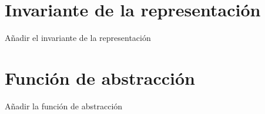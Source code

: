 \hypertarget{repArbolGeneral_invArbolGeneral}{}\section{Invariante de la representación}\label{repArbolGeneral_invArbolGeneral}
Añadir el invariante de la representación\hypertarget{repArbolGeneral_faArbolGeneral}{}\section{Función de abstracción}\label{repArbolGeneral_faArbolGeneral}
Añadir la función de abstracción 